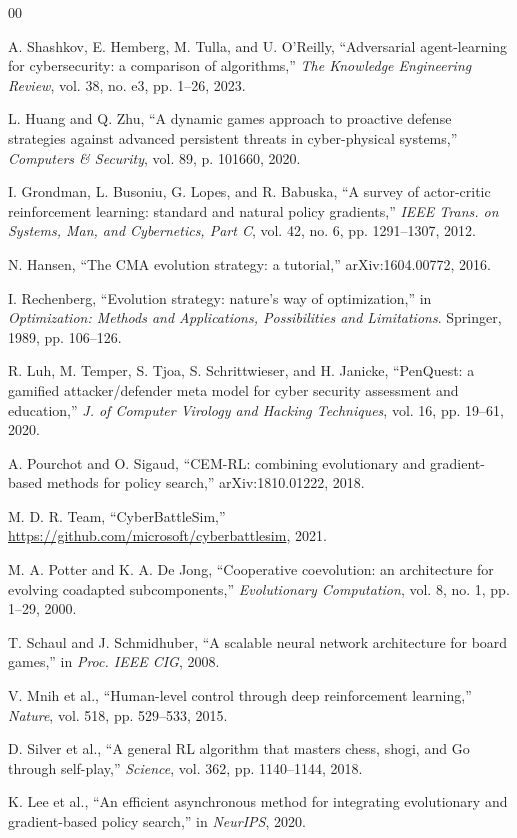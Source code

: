 \documentclass[conference, 10pt]{IEEEtran}
\begin{document}
\begin{thebibliography}{00}

A. Shashkov, E. Hemberg, M. Tulla, and U. O'Reilly, ``Adversarial agent-learning for cybersecurity: a comparison of algorithms,'' \textit{The Knowledge Engineering Review}, vol. 38, no. e3, pp. 1--26, 2023.

L. Huang and Q. Zhu, ``A dynamic games approach to proactive defense strategies against advanced persistent threats in cyber-physical systems,'' \textit{Computers \& Security}, vol. 89, p. 101660, 2020.

I. Grondman, L. Busoniu, G. Lopes, and R. Babuska, ``A survey of actor-critic reinforcement learning: standard and natural policy gradients,'' \textit{IEEE Trans. on Systems, Man, and Cybernetics, Part C}, vol. 42, no. 6, pp. 1291--1307, 2012.

N. Hansen, ``The CMA evolution strategy: a tutorial,'' arXiv:1604.00772, 2016.

I. Rechenberg, ``Evolution strategy: nature's way of optimization,'' in \textit{Optimization: Methods and Applications, Possibilities and Limitations}. Springer, 1989, pp. 106--126.

R. Luh, M. Temper, S. Tjoa, S. Schrittwieser, and H. Janicke, ``PenQuest: a gamified attacker/defender meta model for cyber security assessment and education,'' \textit{J. of Computer Virology and Hacking Techniques}, vol. 16, pp. 19--61, 2020.

A. Pourchot and O. Sigaud, ``CEM-RL: combining evolutionary and gradient-based methods for policy search,'' arXiv:1810.01222, 2018.

M. D. R. Team, ``CyberBattleSim,'' \url{https://github.com/microsoft/cyberbattlesim}, 2021.

M. A. Potter and K. A. De Jong, ``Cooperative coevolution: an architecture for evolving coadapted subcomponents,'' \textit{Evolutionary Computation}, vol. 8, no. 1, pp. 1--29, 2000.

T. Schaul and J. Schmidhuber, ``A scalable neural network architecture for board games,'' in \textit{Proc. IEEE CIG}, 2008.

V. Mnih et al., ``Human-level control through deep reinforcement learning,'' \textit{Nature}, vol. 518, pp. 529--533, 2015.

D. Silver et al., ``A general RL algorithm that masters chess, shogi, and Go through self-play,'' \textit{Science}, vol. 362, pp. 1140--1144, 2018.

K. Lee et al., ``An efficient asynchronous method for integrating evolutionary and gradient-based policy search,'' in \textit{NeurIPS}, 2020.

\end{thebibliography}
\end{document}
